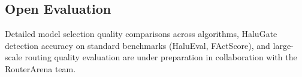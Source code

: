 \subsection{Open Evaluation}

Detailed model selection quality comparisons across algorithms, HaluGate detection accuracy on standard benchmarks (HaluEval, FActScore), and large-scale routing quality evaluation are under preparation in collaboration with the RouterArena team.
